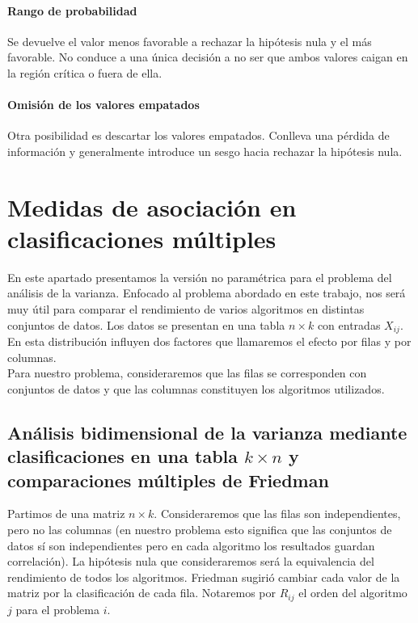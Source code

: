 \paragraph{Rango de probabilidad} Se devuelve el valor menos 
favorable a rechazar la hipótesis nula y el más favorable. No 
conduce a una única decisión a no ser que ambos valores 
caigan en la región crítica o fuera de ella.

\paragraph{Omisión de los valores empatados} Otra posibilidad 
es descartar los valores empatados. Conlleva una pérdida de 
información y generalmente introduce un sesgo hacia rechazar 
la hipótesis nula.

	
\section{Medidas de asociación en clasificaciones múltiples}	

	En este apartado presentamos la versión no paramétrica 
para el problema del análisis de la varianza. Enfocado al 
problema abordado en este trabajo, nos será muy útil para 
comparar el rendimiento de varios algoritmos en distintas 
conjuntos de datos. Los datos se presentan en una tabla $n \times 
k$ con entradas $X_{ij}$. En esta distribución influyen dos 
factores que llamaremos el efecto por filas y por columnas.\\
	Para nuestro problema, consideraremos que las filas se 
corresponden con conjuntos de datos y que las columnas 
constituyen los algoritmos utilizados. 
	
\subsection{Análisis bidimensional de la varianza mediante clasificaciones en una tabla $k \times n$ y comparaciones múltiples de Friedman}

	Partimos de una matriz $n \times k$. Consideraremos que 
las filas son independientes, pero no las columnas (en 
nuestro problema esto significa que las conjuntos de datos sí 
son independientes pero en cada algoritmo los resultados guardan 
correlación). La hipótesis nula que consideraremos será la 
equivalencia del rendimiento de todos los algoritmos.
Friedman sugirió cambiar cada valor de la 
matriz por la clasificación de cada fila. Notaremos por $R_{ij}$
el orden del algoritmo $j$ para el problema $i$.

